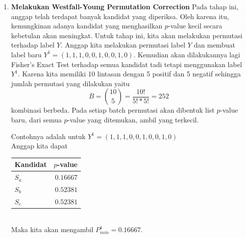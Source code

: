 \documentclass[a4paper,twoside]{article}
\begin{document}
\begin{enumerate}
	\item \textbf{Melakukan Westfall-Young Permutation Correction}
	Pada tahap ini, anggap telah terdapat banyak kandidat yang diperiksa. 
	Oleh karena itu, kemungkinan adanya kandidat yang menghasilkan $p$-value kecil secara kebetulan akan meningkat. 
	Untuk tahap ini, kita akan melakukan permutasi terhadap label $Y$.
	Anggap kita melakukan permutasi label $Y$ dan membuat label baru $Y^1 = (1,1,1,0,0,1,0,0,1,0)$.
	Kemudian akan dilakukannya lagi Fisher's Exact Test terhadap semua kandidat tadi tetapi menggunakan label $Y^1$.
	Karena kita memiliki 10 lintasan dengan 5 positif dan 5 negatif sehingga jumlah permutasi yang dilakukan yaitu \[ B = \binom{10}{5} = \frac{10!}{5!*5!} = 252 \] kombinasi berbeda.
	Pada setiap batch permutasi akan dibentuk list $p$-value baru, dari semua $p$-value yang ditemukan, ambil yang terkecil.

	Contohnya adalah untuk $Y^1 = (1,1,1,0,0,1,0,0,1,0)$ \\
	Anggap kita dapat \\
	\begin{tabular}{l|r}
		\textbf{Kandidat} & \textbf{$p$-value} \\
		\midrule
		$S_a$ & $0.16667$ \\
		$S_b$ & $0.52381$ \\
		$S_c$ & $0.52381$ \\
	\end{tabular} \\
	Maka kita akan mengambil $P_{min}^1 = 0.16667$.


\end{enumerate}
\end{document}
